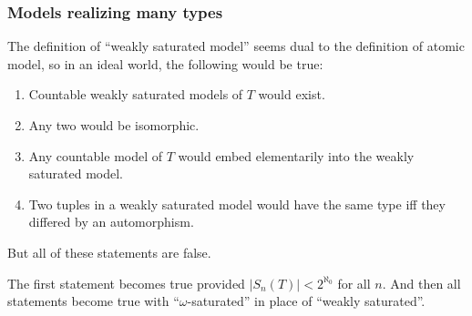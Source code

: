 \documentclass[t,xcolor=dvipsnames,handout]{beamer}
\theoremstyle{theoremFermat}
\theoremstyle{reimann}
\theoremstyle{ACExample}
\begin{document}
\begin{frame} 
  \frametitle{Models realizing many types}


\pause

The definition of ``weakly saturated model''
seems dual to the definition
of atomic model, \pause so
in an ideal world, the following would be true:
\pause

\begin{enumerate}
\item Countable weakly saturated models of $T$ would exist. \pause
\item Any two would be isomorphic. \pause
\item Any countable model of $T$ would embed
  elementarily into the weakly saturated model. \pause
\item Two tuples in a weakly saturated model
  would have the same type iff they
  differed by an automorphism. \pause
\end{enumerate}

\medskip

But all of these statements are false. \pause

The first statement becomes true provided $|S_n(T)|<2^{\aleph_0}$
for all $n$. \pause
And then all statements become true with ``$\omega$-saturated''
in place of ``weakly saturated''.
\end{frame}
\end{document}
